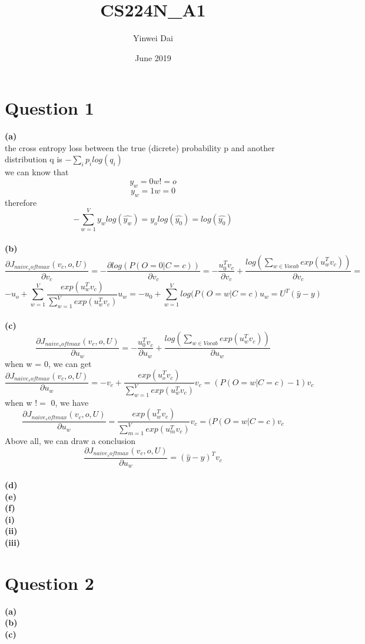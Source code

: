 \documentclass{article}
\title{CS224N_A1}
\author{Yinwei Dai}
\date{June 2019}
\begin{document}
\maketitle

\section{Question 1}

\textbf{(a)}\\
the cross entropy loss between the true (dicrete) probability p and another distribution q is $-\sum_i p_ilog(q_i)$\\
we can know that\\
$$
y_w = 0 w != o
$$
$$
y_w = 1 w = 0 
$$
therefore 
$$
-\sum_{w = 1}^{V} y_w log(\hat{y_w}) = y_o log(\hat{y_0}) = log(\hat{y_0})
$$
\\
\textbf{(b)}\\ 
$$
\frac{\partial J_{naive_softmax}(v_c, o, U)}{\partial v_c} = -\frac{\partial log(P(O = 0 | C = c))}{\partial v_c} = 
-\frac{u_0^{T}v_c}{\partial v_c} + \frac{log(\sum_{w \in Vocab} exp(u_w^T v_c))}{\partial v_c} = 
$$
$$
-u_o + \sum_{w = 1}^{V} \frac{exp(u_w^T v_c)}{ \sum_{w = 1}^{V}exp(u_w^T v_c) } u_w = -u_0 +  \sum_{w = 1}^{V}log(P(O = w | C = c) u_w = U^T(\hat{y} - y)
$$
\\
\textbf{(c)}\\
$$
\frac{\partial J_{naive_softmax}(v_c, o, U)}{\partial u_w} = -\frac{u_0^{T}v_c}{\partial u_w} + \frac{log(\sum_{w \in Vocab} exp(u_w^T v_c))}{\partial u_w}
$$
when w = 0, we can get 
$$
\frac{\partial J_{naive_softmax}(v_c, o, U)}{\partial u_w} = -v_c +  \frac{exp(u_o^T v_c)}{ \sum_{w = 1}^{V}exp(u_w^T v_c) } v_c = (P(O = w | C = c) - 1)v_c 
$$
when w $!=$ 0, we have 
$$
\frac{\partial J_{naive_softmax}(v_c, o, U)}{\partial u_w} =  \frac{exp(u_w^T v_c)}{ \sum_{m = 1}^{V}exp(u_m^T v_c) } v_c = (P(O = w | C = c) v_c
$$
Above all, we can draw a conclusion
$$
\frac{\partial J_{naive_softmax}(v_c, o, U)}{\partial u_w} = (\hat{y} - y)^T v_c
$$
\\
\textbf{(d)}\\
\textbf{(e)}\\
\textbf{(f)}\\
\textbf{(i)}\\
\textbf{(ii)}\\
\textbf{(iii)}\\

\section{Question 2}

\textbf{(a)}\\
\textbf{(b)}\\
\textbf{(c)}\\
\end{document}
